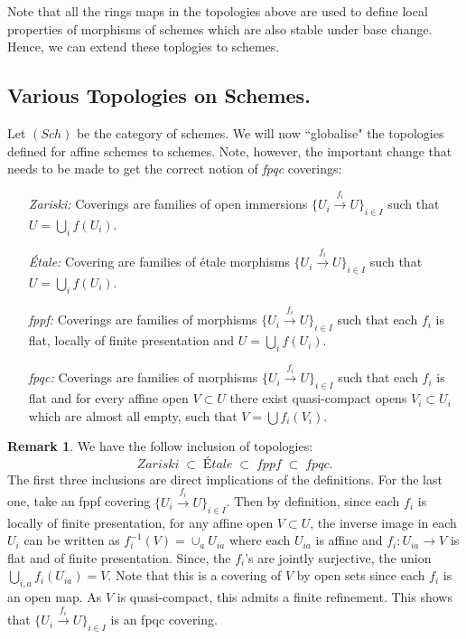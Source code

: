\documentclass[11pt]{amsart}
\newcommand{\Spec}{{\rm Spec \,}}
\theoremstyle{definition}
\newtheorem{remark}[theorem]{Remark}
\begin{document}

Note that all the rings maps in the topologies above are used to define local properties of morphisms of schemes which are also stable under base change. Hence, we can extend these toplogies to schemes.

\subsection{Various Topologies on Schemes.}
Let $(\mathit{Sch})$ be the category of schemes. We will now ``globalise" the topologies defined for affine schemes to schemes. Note, however, the important change that needs to be made to get the correct notion of \textit{fpqc} coverings:


\begin{enumerate}
	\item[\textit{Zariski:}]  Coverings are families of open immersions $\{ U_i \overset{f_i}{\to} U\}_{i \in I}$ such that $U= \bigcup_i f(U_i)$.
	\item[\textit{\'{E}tale:}] Covering are families of \'{e}tale morphisms $\{ U_i \overset{f_i}{\to} U\}_{i \in I}$ such that $U= \bigcup_i f(U_i)$.
	\item[\textit{fppf:}] Coverings are families of morphisms $\{ U_i \overset{f_i}{\to} U\}_{i \in I}$ such that each $f_i$ is flat, locally of finite presentation and $U= \bigcup_i f(U_i)$.
	\item[\textit{fpqc:}] Coverings are families of morphisms $\{ U_i \overset{f_i}{\to} U\}_{i \in I}$ such that each $f_i$ is flat and for every affine open $V \subset U$ there exist quasi-compact opens $V_i \subset U_i$ which are almost all empty, such that $V = \bigcup f_i(V_i)$.
\end{enumerate}


\begin{remark}
	We have the follow inclusion of topologies:
	\[\textit{Zariski}\;\subset\; \textit{\'{E}tale}\;\subset\; \textit{fppf}\;\subset\; \textit{fpqc}.\]
	The first three inclusions are direct implications of the definitions. For the last one, take an fppf covering $\{ U_i \overset{f_i}{\to} U\}_{i \in I}$. Then by definition, since each $f_i$ is locally of finite presentation, for any affine open $V\subset U$, the inverse image in each $U_i$ can be written as $f_i^{-1}(V)=\cup_a U_{ia}$ where each $U_{ia}$ is affine and $f_i: U_{ia}\rightarrow V$ is flat and of finite presentation. Since, the $f_i$'s are jointly surjective, the union $\bigcup_{i,a}f_i(U_{ia})=V$. Note that this is a covering of $V$ by open sets since each $f_i$ is an open map. As $V$ is quasi-compact, this admits a finite refinement. This shows that $\{ U_i \overset{f_i}{\to} U\}_{i \in I}$ is an fpqc covering.
\end{remark}
\end{document}
